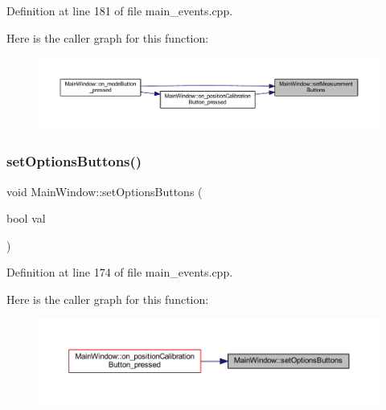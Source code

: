 Definition at line 181 of file main\+\_\+events.\+cpp.

Here is the caller graph for this function\+:
\nopagebreak
\begin{figure}[H]
\begin{center}
\leavevmode
\includegraphics[width=350pt]{class_main_window_aa6af159870a097c8347efae3a7c26e6f_icgraph}
\end{center}
\end{figure}
\mbox{\label{class_main_window_a47326e5f671c05053baaa75a2a4059e7}} 
\subsubsection{\texorpdfstring{setOptionsButtons()}{setOptionsButtons()}}
{\footnotesize\ttfamily void Main\+Window\+::set\+Options\+Buttons (\begin{DoxyParamCaption}\item[{bool}]{val }\end{DoxyParamCaption})\hspace{0.3cm}{\ttfamily [private]}}



Definition at line 174 of file main\+\_\+events.\+cpp.

Here is the caller graph for this function\+:
\nopagebreak
\begin{figure}[H]
\begin{center}
\leavevmode
\includegraphics[width=350pt]{class_main_window_a47326e5f671c05053baaa75a2a4059e7_icgraph}
\end{center}
\end{figure}
\mbox{\label{class_main_window_a64190d66464e087f1df9ba7541ae52ff}} 
